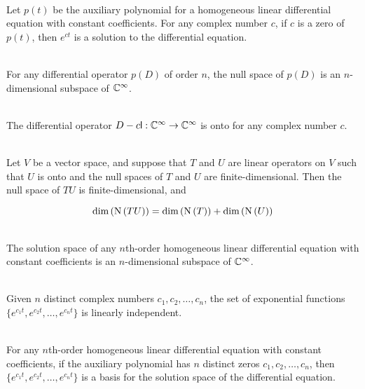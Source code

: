 \begin{theorem}
	\hfill\\
	Let $p(t)$ be the auxiliary polynomial for a homogeneous linear differential equation with constant coefficients. For any complex number $c$, if $c$ is a zero of $p(t)$, then $e^{ct}$ is a solution to the differential equation.
\end{theorem}

\begin{theorem}
	\hfill\\
	For any differential operator $p(D)$ of order $n$, the null space of $p(D)$ is an $n$-dimensional subspace of $\mathbb{C}^\infty$.
\end{theorem}

\begin{lemma}
	\hfill\\
	The differential operator $D - c\mathsf{l}: \mathbb{C}^\infty \to \mathbb{C}^\infty$ is onto for any complex number $c$.
\end{lemma}

\begin{lemma}
	\hfill\\
	Let $V$ be a vector space, and suppose that $T$ and $U$ are linear operators on $V$ such that $U$ is onto and the null spaces of $T$ and $U$ are finite-dimensional. Then the null space of $TU$ is finite-dimensional, and
	
	\[\text{dim}\left(\text{N}\left(TU\right)\right) = \text{dim}\left(\text{N}\left(T\right)\right) + \text{dim}\left(\text{N}\left(U\right)\right)\]
\end{lemma}

\begin{corollary}
	\hfill\\
	The solution space of any $n$th-order homogeneous linear differential equation with constant coefficients is an $n$-dimensional subspace of $\mathbb{C}^\infty$.
\end{corollary}

\begin{theorem}
	\hfill\\
	Given $n$ distinct complex numbers $c_1, c_2, \dots, c_n$, the set of exponential functions $\{e^{c_1t},e^{c_2t},\dots,e^{c_nt}\}$ is linearly independent.
\end{theorem}

\begin{corollary}
	\hfill\\
	For any $n$th-order homogeneous linear differential equation with constant coefficients, if the auxiliary polynomial has $n$ distinct zeros $c_1, c_2, \dots, c_n$, then $\{e^{c_1t}, e^{c_2t}, \dots, e^{c_nt}\}$ is a basis for the solution space of the differential equation.
\end{corollary}

